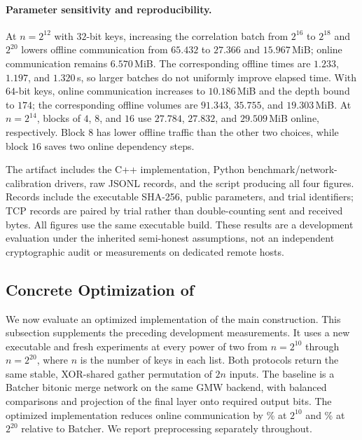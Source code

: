 \paragraph{Parameter sensitivity and reproducibility.}
At $n=2^{12}$ with $32$-bit keys, increasing the correlation batch from
$2^{16}$ to $2^{18}$ and $2^{20}$ lowers offline communication from $65.432$
to $27.366$ and $15.967$\,MiB; online communication remains $6.570$\,MiB.
The corresponding offline times are $1.233$, $1.197$, and $1.320$\,s, so
larger batches do not uniformly improve elapsed time. With $64$-bit keys,
online communication increases to $10.186$\,MiB and the depth bound to $174$;
the corresponding offline volumes are $91.343$, $35.755$, and $19.303$\,MiB.
At $n=2^{14}$, blocks of $4$, $8$, and $16$ use $27.784$, $27.832$, and
$29.509$\,MiB online, respectively. Block $8$ has lower offline traffic than
the other two choices, while block $16$ saves two online dependency steps.

The artifact includes the C++ implementation, Python benchmark/network-calibration
drivers, raw JSONL records, and the script producing all four figures.
Records include the executable SHA-256, public parameters, and trial identifiers;
TCP records are paired by trial rather than double-counting sent and received
bytes. All figures use the same executable build. These results are a development
evaluation under the inherited semi-honest assumptions, not an independent
cryptographic audit or measurements on dedicated remote hosts.
\clearpage


\subsection{Concrete Optimization of \ourprotocol}\label{sec:packed-eval}


We now evaluate an optimized implementation of the main construction.
This subsection supplements the preceding development measurements.
It uses a new executable and fresh experiments at every power of two from
$n=2^{10}$ through $n=2^{20}$, where $n$ is the number of keys in each list.
Both protocols return the same stable, XOR-shared gather permutation of $2n$
inputs. The baseline is a Batcher bitonic merge network on the same GMW backend,
with balanced comparisons and projection of the final layer onto required output bits.
The optimized implementation reduces online communication by
\packedSmallReduction\% at $2^{10}$ and \packedLargeReduction\% at $2^{20}$
relative to Batcher. We report preprocessing separately throughout.

